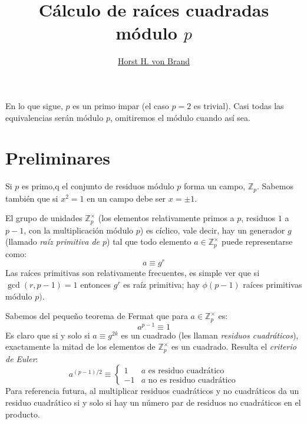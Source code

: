 \documentclass[english,spanish,fleqn]{article}
\title{Cálculo de raíces cuadradas módulo \(p\)}
\author{\href{mailto:vonbrand@inf.utfsm.cl}{Horst H. von Brand}}
\begin{document}
\maketitle
\thispagestyle{empty}

  En lo que sigue,
  \(p\) es un primo impar
  (el caso  \(p = 2\) es trivial).
  Casi todas las equivalencias serán módulo \(p\),
  omitiremos el módulo cuando así sea.

\section{Preliminares}
\label{sec:preliminares}

  Si \(p\) es primo,q
  el conjunto de residuos módulo \(p\) forma un campo,
  \(\mathbb{Z}_p\).
  Sabemos también que si \(x^2 = 1\) en un campo debe ser \(x = \pm 1\).

  El grupo de unidades \(\mathbb{Z}_p^\times\)
  (los elementos relativamente primos a \(p\),
   residuos \(1\) a \(p - 1\),
   con la multiplicación módulo \(p\))
  es cíclico,
  vale decir,
  hay un generador \(g\)
  (llamado \emph{raíz primitiva de \(p\)})
  tal que todo elemento \(a \in \mathbb{Z}_p^\times\) puede representarse como:
  \begin{equation}
    \label{eq:units-powers}
    a
      \equiv g^r
  \end{equation}
  Las raíces primitivas son relativamente frecuentes,
  es simple ver que si \(\gcd(r, p - 1) = 1\)
  entonces \(g^r\) es raíz primitiva;
  hay \(\phi(p - 1)\) raíces primitivas módulo \(p)\).

  Sabemos del pequeño teorema de Fermat que para \(a \in \mathbb{Z}_p^\times\)
  es:
  \begin{equation}
    \label{eq:Fermat}
    a^{p - 1}
      \equiv 1
  \end{equation}
  Es claro que si y solo si \(a \equiv g^{2 k}\) es un cuadrado
  (les llaman \emph{residuos cuadráticos}),
  exactamente la mitad de los elementos de \(\mathbb{Z}_p^\times\)
  es un cuadrado.
  Resulta el \emph{criterio de Euler}:
  \begin{equation}
    \label{eq:Euler-criterion}
    a^{(p - 1) / 2}
      \equiv \begin{cases}
                1 & \text{\(a\) es residuo cuadrático} \\
               -1 & \text{\(a\) no es residuo cuadrático}
             \end{cases}
  \end{equation}
  Para referencia futura,
  al multiplicar residuos cuadráticos y no cuadráticos
  da un residuo cuadrático
  si y solo si hay un número par de residuos no cuadráticos en el producto.
\end{document}

